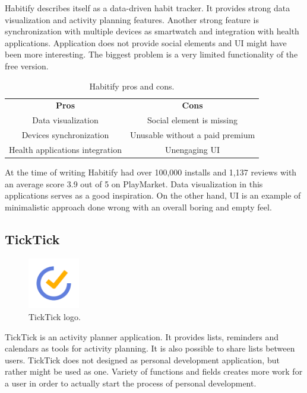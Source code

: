 Habitify describes itself as a data-driven habit tracker.
It provides strong data visualization and activity planning features.
Another strong feature is synchronization with multiple devices as smartwatch and integration with health applications.
Application does not provide social elements and UI might have been more interesting.
The biggest problem is a very limited functionality of the free version.

\begin{table}[h!]
    \centering
    \begin{ctucolortab}
        \begin{tabular}{cc}
            \bfseries Pros & \bfseries Cons\\\Midrule
            Data visualization & Social element is missing\\
            Devices synchronization & Unusable without a paid premium\\
            Health applications integration & Unengaging UI \\
        \end{tabular}
    \end{ctucolortab}
    \caption{Habitify pros and cons.}\label{tab:habitify-pros-cons}
\end{table}

At the time of writing Habitify had over 100,000 installs and 1,137 reviews with an average score 3.9 out of 5 on PlayMarket.
Data visualization in this applications serves as a good inspiration.
On the other hand, UI is an example of minimalistic approach done wrong with an overall boring and empty feel.


\subsection{TickTick}\label{subsec:ticktick}

\begin{figure}[h!]
    \includegraphics[width=0.20\textwidth]{images/ticktick-logo.png}
    \caption{TickTick logo.\cite{ticktick-logo}}
    \label{fig:ticktick-logo}
\end{figure}

TickTick is an activity planner application.
It provides lists, reminders and calendars as tools for activity planning.
It is also possible to share lists between users.
TickTick does not designed as personal development application, but rather might be used as one.
Variety of functions and fields creates more work for a user in order to actually start the process of personal development.

